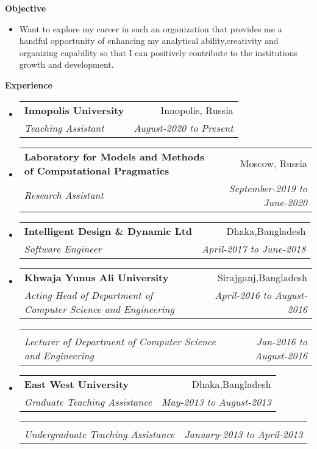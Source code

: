 \documentclass[letterpaper,10pt]{article}
\makeatletter
\newcommand{\resitem}[1]{\item #1 \vspace{-2pt}}
\newcommand{\resheading}[1]{{\large \colorbox{mygrey}{\begin{minipage}{\textwidth}{\textbf{#1 \vphantom{p\^{E}}}}\end{minipage}}}}
\newcommand{\ressubheading}[4]{
\begin{tabular*}{6.5in}{l@{\extracolsep{\fill}}r}
		\textbf{#1} & #2 \\
		\textit{#3} & \textit{#4} \\
\end{tabular*}\vspace{-6pt}}
\makeatother
\begin{document}
\vspace{0.1in}

\resheading{Objective}
\begin{itemize}
\resitem{ \justify
 Want to explore my career in such an organization that provides me a handful opportunity of enhancing my analytical ability,creativity and organizing capability so that I can positively contribute to the institutions growth and development.


 }
\end{itemize}

\vspace{0.1in}
\resheading{Experience}
\begin{itemize}


\item

\ressubheading{Innopolis University}{Innopolis, Russia}{Teaching Assistant}{August-2020 to Present}
\item

\ressubheading{Laboratory for Models and Methods of Computational Pragmatics}{Moscow, Russia}{Research Assistant}{September-2019 to June-2020}

\item

\ressubheading{Intelligent Design \& Dynamic Ltd}{Dhaka,Bangladesh}{Software Engineer}{April-2017 to June-2018}
\item
\ressubheading{Khwaja Yunus Ali University}{Sirajganj,Bangladesh}{Acting Head of Department of Computer Science and Engineering}{April-2016 to August-2016}
\ressubheading{ }{}{Lecturer of Department of Computer Science and Engineering}{Jan-2016 to August-2016 }
\item
	\ressubheading{East West University}{Dhaka,Bangladesh}{Graduate Teaching Assistance }{May-2013 to August-2013 }
\ressubheading{}{}{Undergraduate Teaching Assistance}{January-2013 to April-2013}	
\end{itemize}
\end{document}
